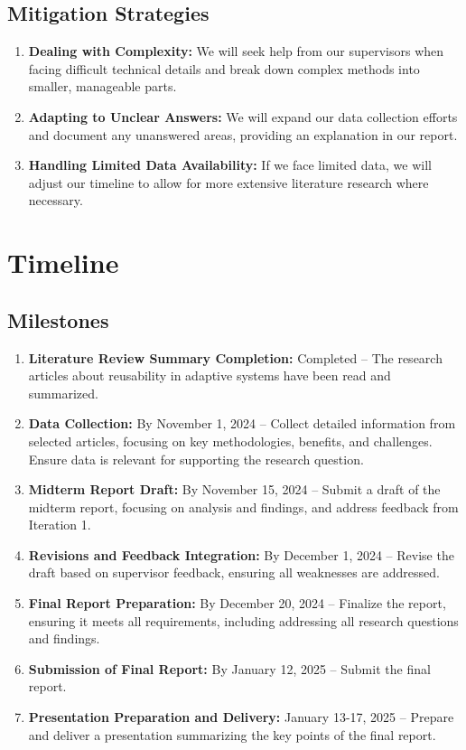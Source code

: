 \documentclass[a4paper, 12pt]{article}
\begin{document}
\subsection*{Mitigation Strategies}
\begin{enumerate}
    \item \textbf{Dealing with Complexity:} We will seek help from our supervisors when facing difficult technical details and break down complex methods into smaller, manageable parts.
    \item \textbf{Adapting to Unclear Answers:} We will expand our data collection efforts and document any unanswered areas, providing an explanation in our report.
    \item \textbf{Handling Limited Data Availability:} If we face limited data, we will adjust our timeline to allow for more extensive literature research where necessary.
\end{enumerate}


\section{Timeline}
\subsection*{Milestones}
\begin{enumerate}
    \item \textbf{Literature Review Summary Completion:} Completed – The research articles about reusability in adaptive systems have been read and summarized.
    \item \textbf{Data Collection:} By November 1, 2024 – Collect detailed information from selected articles, focusing on key methodologies, benefits, and challenges. Ensure data is relevant for supporting the research question.
    \item \textbf{Midterm Report Draft:} By November 15, 2024 – Submit a draft of the midterm report, focusing on analysis and findings, and address feedback from Iteration 1.
    \item \textbf{Revisions and Feedback Integration:} By December 1, 2024 – Revise the draft based on supervisor feedback, ensuring all weaknesses are addressed.
    \item \textbf{Final Report Preparation:} By December 20, 2024 – Finalize the report, ensuring it meets all requirements, including addressing all research questions and findings.
    \item \textbf{Submission of Final Report:} By January 12, 2025 – Submit the final report.
    \item \textbf{Presentation Preparation and Delivery:} January 13-17, 2025 – Prepare and deliver a presentation summarizing the key points of the final report.
\end{enumerate}
\end{document}
